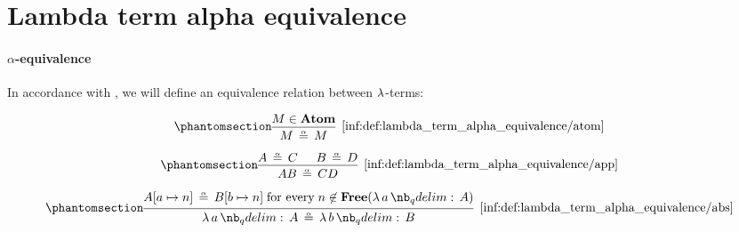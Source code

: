 \section{Lambda term alpha equivalence}\label{sec:lambda_term_alpha_equivalence}

\paragraph{\( \alpha \)-equivalence}

\begin{definition}\label{def:lambda_term_alpha_equivalence}\mimprovised
  In accordance with , we will define an equivalence relation between \( \mathrm{\lambda} \)-terms:

  \begin{paracol}{2}
    \begin{leftcolumn}
      \begin{equation*}\taglabel[\ensuremath{ \logic{Atom}_\alpha }]{inf:def:lambda_term_alpha_equivalence/atom}
        \begin{prooftree}
          \hypo{ M \in \op*{Atom} }
          \infer1[\ref{inf:def:lambda_term_alpha_equivalence/atom}]{ M \aequiv M }
        \end{prooftree}
      \end{equation*}
    \end{leftcolumn}

    \begin{rightcolumn}
      \begin{equation*}\taglabel[\ensuremath{ \logic{App}_\alpha }]{inf:def:lambda_term_alpha_equivalence/app}
        \begin{prooftree}
          \hypo{ A \aequiv C }
          \hypo{ B \aequiv D }
          \infer2[\ref{inf:def:lambda_term_alpha_equivalence/app}]{ AB \aequiv CD }
        \end{prooftree}
      \end{equation*}
    \end{rightcolumn}
  \end{paracol}

  \begin{equation*}\taglabel[\ensuremath{ \logic{Abs}_\alpha }]{inf:def:lambda_term_alpha_equivalence/abs}
    \begin{prooftree}
      \hypo{ A[a \mapsto n] \aequiv B[b \mapsto n] \T{for every} n \not\in \op*{Free}(\qabs a A) }
      \infer1[\ref{inf:def:lambda_term_alpha_equivalence/abs}]{ \qabs a A \aequiv \qabs b B }
    \end{prooftree}
  \end{equation*}
\end{definition}
